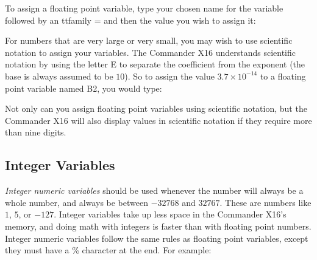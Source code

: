 To assign a floating point variable, type your chosen name for the variable
followed by an {ttfamily =} and then the value you wish to assign it:\\


For numbers that are very large or very small, you may wish to use scientific
notation to assign your variables.  The Commander X16 understands scientific
notation by using the letter {\ttfamily E} to separate the coefficient from the
exponent (the base is always assumed to be $10$).  So to assign the value $3.7
\times 10^{-14}$ to a floating point variable named {\ttfamily B2}, you would
type:\\


Not only can you assign floating point variables using scientific notation, but
the Commander X16 will also display values in scientific notation if they
require more than nine digits.\\

\subsection{Integer Variables}

\emph{Integer numeric variables} should be used whenever the number will always
be a whole number, and always be between $-32768$ and $32767$.  These are
numbers like $1$, $5$, or $-127$.  Integer variables take up less space in the
Commander X16's memory, and doing math with integers is faster than with
floating point numbers.  Integer numeric variables follow the same rules as
floating point variables, except they must have a {\ttfamily \%} character at
the end.  For example:\\



